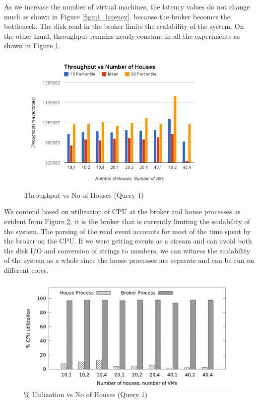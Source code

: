 \vspace*{-0.4cm}
As we increase the number of virtual machines, the latency values do not change much as shown in Figure \ref{fig:q1_latency}. because the broker becomes the bottleneck. The disk read in the broker limits the scalability of the system. On the other hand, throughput remains nearly constant in all the experiments as shown in Figure \ref{fig:q1_throughput}.

\begin{figure}[h]
\begin{center}
	\includegraphics[scale=0.45]{img/q1_throughput}
	\vspace*{-0.4cm}
	\caption{Throughput vs No of Houses (Query 1)\label{fig:q1_throughput}}
\end{center}
\end{figure}

We contend based on utilization of CPU at the broker and house processes as evident from Figure \ref{fig:q1_util}, it is the broker that is currently limiting the scalability of the system.  The parsing of the read event accounts for most of the time spent by the broker on the CPU. If we were getting events as a stream and can avoid both the disk I/O and conversion of strings to numbers, we can witness the scalability of the system as a whole since the house processes are separate and can be run on different cores. 

\begin{figure}[h]
\begin{center}
	\includegraphics[scale=0.5]{img/q1_utilization}
	\vspace*{-0.4cm}
	\caption{\% Utilization vs No of Houses (Query 1)\label{fig:q1_util}}
\end{center}
\end{figure}

